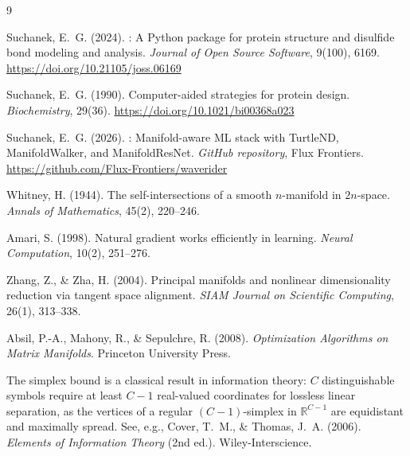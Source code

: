 \documentclass[11pt,letterpaper]{article}
\begin{document}
\begin{thebibliography}{9}

Suchanek, E.~G. (2024).
: A Python package for protein structure and disulfide
  bond modeling and analysis.
\newblock \textit{Journal of Open Source Software}, 9(100), 6169.
\newblock \url{https://doi.org/10.21105/joss.06169}

Suchanek, E.~G. (1990).
\newblock Computer-aided strategies for protein design.
\newblock \textit{Biochemistry}, 29(36).
\newblock \url{https://doi.org/10.1021/bi00368a023}

Suchanek, E.~G. (2026).
: Manifold-aware ML stack with TurtleND, ManifoldWalker,
  and ManifoldResNet.
\newblock \textit{GitHub repository}, Flux Frontiers.
\newblock \url{https://github.com/Flux-Frontiers/waverider}

Whitney, H. (1944).
\newblock The self-intersections of a smooth $n$-manifold in $2n$-space.
\newblock \textit{Annals of Mathematics}, 45(2), 220--246.

Amari, S. (1998).
\newblock Natural gradient works efficiently in learning.
\newblock \textit{Neural Computation}, 10(2), 251--276.

Zhang, Z., \& Zha, H. (2004).
\newblock Principal manifolds and nonlinear dimensionality reduction via
  tangent space alignment.
\newblock \textit{SIAM Journal on Scientific Computing}, 26(1), 313--338.

Absil, P.-A., Mahony, R., \& Sepulchre, R. (2008).
\newblock \textit{Optimization Algorithms on Matrix Manifolds}.
\newblock Princeton University Press.

The simplex bound is a classical result in information theory: $C$
distinguishable symbols require at least $C-1$ real-valued coordinates
for lossless linear separation, as the vertices of a regular
$(C-1)$-simplex in $\mathbb{R}^{C-1}$ are equidistant and maximally
spread.  See, e.g., Cover, T.~M., \& Thomas, J.~A. (2006).
\newblock \textit{Elements of Information Theory} (2nd ed.).
\newblock Wiley-Interscience.

\end{thebibliography}
\end{document}
